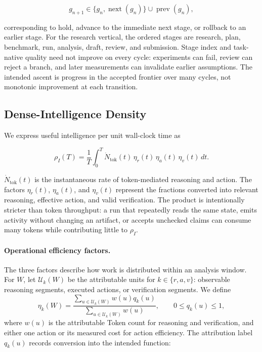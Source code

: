 \begin{equation}
  g_{n+1}
  \in \{g_n,\operatorname{next}(g_n)\}
  \cup \operatorname{prev}(g_n),
  \label{eq:stage-transition}
\end{equation}

corresponding to hold, advance to the immediate next stage, or rollback to an
earlier stage. For the research vertical, the ordered stages are research, plan,
benchmark, run, analysis, draft, review, and submission. Stage index and task-native
quality need not improve on every cycle: experiments can fail, review can reject a
branch, and later measurements can invalidate earlier assumptions. The intended ascent
is progress in the accepted frontier over many cycles, not monotonic improvement at
each transition.

\subsection{Dense-Intelligence Density}

We express useful intelligence per unit wall-clock time as

\begin{equation}
  \rho_I(T)
  =\frac{1}{T}\int_0^T
  \dot N_{\mathrm{tok}}(t)\,
  \eta_r(t)\,\eta_a(t)\,\eta_v(t)\,dt.
  \label{eq:dense-density}
\end{equation}

$\dot N_{\mathrm{tok}}(t)$ is the instantaneous rate of token-mediated reasoning
and action. The factors $\eta_r(t)$, $\eta_a(t)$, and $\eta_v(t)$ represent the
fractions converted into relevant reasoning, effective action, and valid
verification. The product is intentionally stricter than token throughput: a run
that repeatedly reads the same state, emits activity without changing an artifact,
or accepts unchecked claims can consume many tokens while contributing little to
$\rho_I$.

\paragraph{Operational efficiency factors.}
The three factors describe how work is distributed within an analysis window. For
$W$, let $\mathcal{U}_k(W)$ be the attributable units for
$k\in\{r,a,v\}$: observable reasoning segments, executed actions, or verification
segments. We define
\begin{equation}
  \eta_k(W)
  =\frac{\sum_{u\in\mathcal{U}_k(W)} w(u)q_k(u)}
         {\sum_{u\in\mathcal{U}_k(W)} w(u)},
  \qquad 0\leq q_k(u)\leq1,
  \label{eq:operational-efficiency}
\end{equation}
where $w(u)$ is the attributable Token count for reasoning and verification, and
either one action or its measured cost for action efficiency. The attribution label
$q_k(u)$ records conversion into the intended function:

